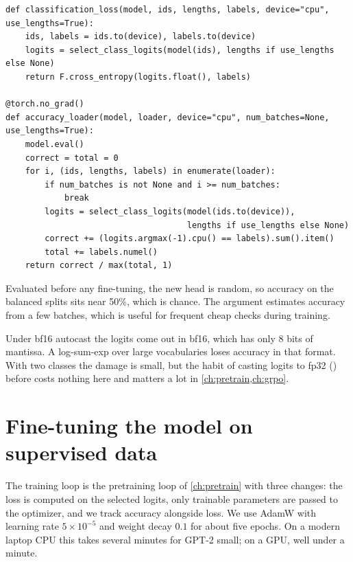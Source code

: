\begin{lstlisting}[caption={Loss on a batch and accuracy over a loader.},label={lst:classify:acc}]
def classification_loss(model, ids, lengths, labels, device="cpu", use_lengths=True):
    ids, labels = ids.to(device), labels.to(device)
    logits = select_class_logits(model(ids), lengths if use_lengths else None)
    return F.cross_entropy(logits.float(), labels)

@torch.no_grad()
def accuracy_loader(model, loader, device="cpu", num_batches=None, use_lengths=True):
    model.eval()
    correct = total = 0
    for i, (ids, lengths, labels) in enumerate(loader):
        if num_batches is not None and i >= num_batches:
            break
        logits = select_class_logits(model(ids.to(device)),
                                     lengths if use_lengths else None)
        correct += (logits.argmax(-1).cpu() == labels).sum().item()
        total += labels.numel()
    return correct / max(total, 1)
\end{lstlisting}

Evaluated before any fine-tuning, the new head is random, so accuracy on the balanced
splits sits near 50\%, which is chance. The  argument estimates
accuracy from a few batches, which is useful for frequent cheap checks during training.

\begin{pitfall}
Under bf16 autocast the logits come out in bf16, which has only 8 bits of mantissa. A
log-sum-exp over large vocabularies loses accuracy in that format. With two classes
the damage is small, but the habit of casting logits to fp32 ()
before  costs nothing here and matters a lot in
\cref{ch:pretrain,ch:grpo}.
\end{pitfall}

\section{Fine-tuning the model on supervised data}\label{sec:classify:train}

The training loop is the pretraining loop of \cref{ch:pretrain} with three changes: the
loss is computed on the selected logits, only trainable parameters are passed to the
optimizer, and we track accuracy alongside loss. We use AdamW
with learning rate $5\times10^{-5}$ and weight decay $0.1$ for about five epochs. On a
modern laptop CPU this takes several minutes for GPT-2 small; on a GPU, well under a
minute.

